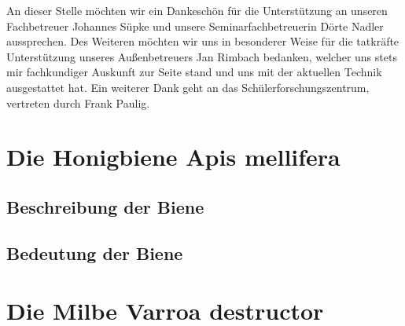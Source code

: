 \documentclass[11pt,a4paper]{article}
\begin{document}
An dieser Stelle möchten wir ein Dankeschön für die Unterstützung an unseren Fachbetreuer Johannes Süpke und unsere Seminarfachbetreuerin Dörte Nadler aussprechen. Des Weiteren möchten wir uns in besonderer Weise für die tatkräfte Unterstützung unseres Außenbetreuers Jan Rimbach bedanken, welcher uns stets mir fachkundiger Auskunft zur Seite stand und uns mit der aktuellen Technik ausgestattet hat. Ein weiterer Dank geht an das Schülerforschungszentrum, vertreten durch Frank Paulig. \\




\newpage
\section{Die Honigbiene Apis mellifera}
\subsection{Beschreibung der Biene}
\subsection{Bedeutung der Biene}

\section{Die Milbe Varroa destructor}
\end{document}

